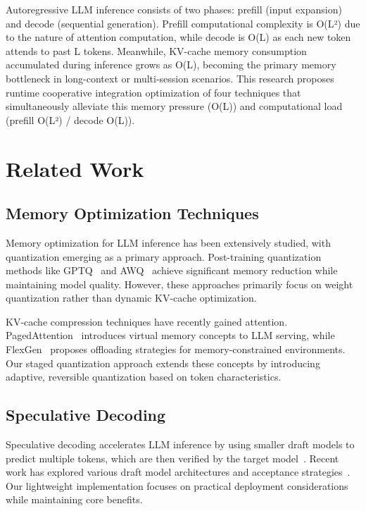 \documentclass[twocolumn,10pt]{article}
\begin{document}
Autoregressive LLM inference consists of two phases: prefill (input expansion) and decode (sequential generation). Prefill computational complexity is O(L²) due to the nature of attention computation, while decode is O(L) as each new token attends to past L tokens. Meanwhile, KV-cache memory consumption accumulated during inference grows as O(L), becoming the primary memory bottleneck in long-context or multi-session scenarios. This research proposes runtime cooperative integration optimization of four techniques that simultaneously alleviate this memory pressure (O(L)) and computational load (prefill O(L²) / decode O(L)).

\section{Related Work}

\subsection{Memory Optimization Techniques}

Memory optimization for LLM inference has been extensively studied, with quantization emerging as a primary approach. Post-training quantization methods like GPTQ~\cite{frantar2022gptq} and AWQ~\cite{lin2023awq} achieve significant memory reduction while maintaining model quality. However, these approaches primarily focus on weight quantization rather than dynamic KV-cache optimization.

KV-cache compression techniques have recently gained attention. PagedAttention~\cite{kwon2023efficient} introduces virtual memory concepts to LLM serving, while FlexGen~\cite{sheng2023flexgen} proposes offloading strategies for memory-constrained environments. Our staged quantization approach extends these concepts by introducing adaptive, reversible quantization based on token characteristics.

\subsection{Speculative Decoding}

Speculative decoding accelerates LLM inference by using smaller draft models to predict multiple tokens, which are then verified by the target model~\cite{leviathan2023fast}. Recent work has explored various draft model architectures and acceptance strategies~\cite{chen2023accelerating}. Our lightweight implementation focuses on practical deployment considerations while maintaining core benefits.
\end{document}
